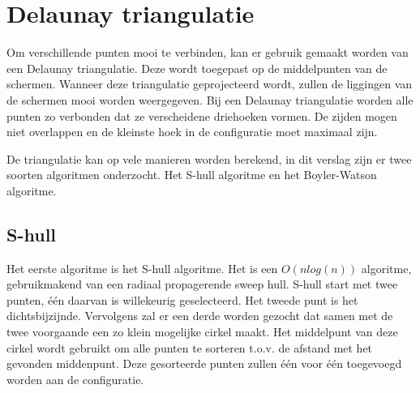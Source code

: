 \section{Delaunay triangulatie}
Om verschillende punten mooi te verbinden, kan er gebruik gemaakt worden van een Delaunay triangulatie. Deze wordt toegepast op de middelpunten van de schermen. Wanneer deze triangulatie geprojecteerd wordt, zullen de liggingen van de schermen mooi worden weergegeven. Bij een Delaunay triangulatie worden alle punten zo verbonden dat ze verscheidene driehoeken vormen. De zijden mogen niet overlappen en de kleinste hoek in de configuratie moet maximaal zijn. \cite{delaunaywiki}

De triangulatie kan op vele manieren worden berekend, in dit verslag zijn er twee soorten algoritmen onderzocht. Het S-hull algoritme en het Boyler-Watson algoritme.

\subsection{S-hull}
Het eerste algoritme is het S-hull algoritme. Het is een $O(nlog(n))$ algoritme, gebruikmakend van een radiaal propagerende sweep hull. S-hull start met twee punten, één daarvan is willekeurig geselecteerd. Het tweede punt is het dichtsbijzijnde. Vervolgens zal er een derde worden gezocht dat samen met de twee voorgaande een zo klein mogelijke cirkel maakt. Het middelpunt van deze cirkel wordt gebruikt om alle punten te sorteren t.o.v. de afstand met het gevonden middenpunt. Deze gesorteerde punten zullen één voor één toegevoegd worden aan de configuratie.

